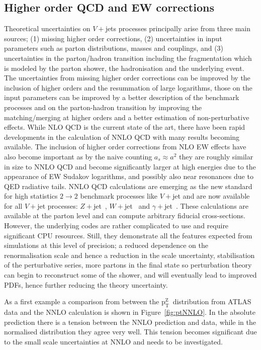 \documentclass[a4paper,11pt,notoc]{article}
\newcommand{\ptZ}{\ensuremath{\mathrm{p_T^{Z}}}}
\begin{document}
\subsection{Higher order QCD and EW corrections}
Theoretical uncertainties on $V+$jets processes principally arise from three
main sources; (1) missing higher order corrections, (2) uncertainties in input
parameters such as parton distributions, masses and couplings, and (3)
uncertainties in the parton/hadron transition including the fragmentation which
is modeled by the parton shower, the hadronisation and the underlying event. The
uncertainties from missing higher order corrections can be improved by the
inclusion of higher orders and the resummation of large logarithms, those on the
input parameters can be improved by a better description of the benchmark
processes and on the parton-hadron transition by improving the matching/merging
at higher orders and a better estimation of non-perturbative effects. While NLO
QCD is the current state of the art, there have been rapid developments in the
calculation of NNLO QCD with many results becoming available. The inclusion of
higher order corrections from NLO EW effects have also become important as by
the naive counting $a_s \approx a^2$ they are roughly similar in size to
NNLO QCD and become significantly larger at high energies due to the appearance
of EW Sudakov logarithms, and possibly also near resonances due to QED radiative
tails. NNLO QCD calculations are emerging as the new standard for high statistics
$2\to2$ benchmark processes like $V+$jet and are now available for all $V+$jet processes:
$Z+$jet~\cite{Ridder:2015dxa,Ridder:2016nkl,Gehrmann-DeRidder:2016jns,Boughezal:2015ded,Boughezal:2016isb},
$W+$jet~\cite{Boughezal:2015dva,Boughezal:2016dtm} and
$\gamma+$jet~\cite{Campbell:2016lzl,Campbell:2017dqk}.
%
These calculations are available at the parton level and can compute arbitrary fiducial
cross-sections. However, the underlying codes are rather complicated to use and require significant CPU
resources. Still, they demonstrate all the features expected from simulations at this level 
of precision; a reduced dependence on the renormalisation scale and hence a
reduction in the scale uncertainty, stabilisation of the perturbative series,
more partons in the final state so perturbation theory can begin to reconstruct
some of the shower, and will eventually lead to improved PDFs, hence further
reducing the theory uncertainty. 

As a first example a comparison from \cite{Ridder:2016nkl}
between the \ptZ\ distribution from ATLAS data and the NNLO calculation is shown in Figure~\ref{fig:ptNNLO}.
In the absolute prediction there is a tension between the NNLO prediction and data, while in the normalised distribution they agree very well. This tension becomes significant due to the small  scale uncertainties
at NNLO and needs to be investigated.
\end{document}

